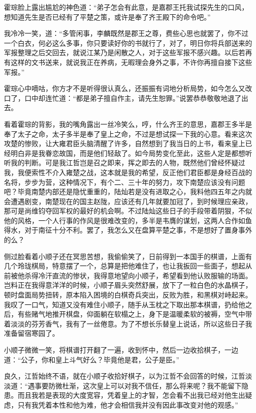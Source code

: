 霍琮脸上露出尴尬的神色道：“弟子怎会有此意，是嘉郡王托我试探先生的口风，想知道先生是否已经有了平楚之策，或许是奉了齐王殿下的命令吧。”

我冷冷一笑，道：“多管闲事，李麟既然是郡王之尊，费些心思也就罢了，你不过一个白衣，何必这么多事，你只要读好你的书就行了，对了，明日你将兵部送来的军报整理之后交回去，就说江某乃是闲散之人，对于这些军报不感兴趣。以后若再有这样的文书送来，就说我正在养病，无暇理会身外之事，不许你再擅自接下这些军报。”

霍琮心中嘀咕，你方才不是听得很认真么，还振振有词地分析局势，如今怎么又改口了，口中却连忙道：“都是弟子擅自作主，请先生恕罪。”说罢恭恭敬敬地退了出去。

看着霍琮的背影，我的嘴角露出一丝冷笑么，哼，什么齐王的意思，嘉郡王多半是奉了太子之命，太子多半是奉了皇上之命，不过是想试探一下我的心意。看来这次攻楚的惨败，让大雍君臣头脑清醒了许多，自然想到了我当日的上书，看来皇上已经明白非是我眷恋故国，而是他们轻敌了。如今局势变化至此，这些人定是都想听听我的判断。可是我江哲岂是召之即来，挥之即去的人物，既然他们曾经怀疑过我，我便索性不介入雍楚之战，这本就是我的希望，反正他们君臣都是身经百战的名将，步步为营，这种情况下，有个二、三十年的努力，攻下南楚应该没有问题吧？毕竟南楚内部还是隐忧重重的，陆灿若是没有进取之心，我料他四五年之内就会遭遇剧变，南楚现在的国主赵陇，应该还有几年就要加冠了，到时候理应亲政，那可是尚维钧夺回军权的最好的机会啊。不过陆灿这些日子的手段带着阴狠，不似他的风格，一个人行事的作风是很难改变的，多半是韦膺的谋划，这两人合作如鱼得水，对于南征十分不利。罢了，我怎么又在盘算平楚之事，不是想好了置身事外的么？

侧过脸看着小顺子还在冥思苦想，我偷偷笑了，日前得到一本国手的棋谱，上面有几个玲珑棋局，特意摆了一个，总算是把他难住了，也让我扳回一些面子，想起从前被他杀得冷汗直流的惨状，我得意地望向小顺子，希望看到他认败服输的场面。岂料正在我得意洋洋的时候，小顺子眉头突然舒展，放下了一粒白色的水晶棋子，顿时盘面局势扭转，原本陷入困境的白棋奇兵突出，反败为胜，和黑棋对峙起来。我叹了一口气，知道又没有难住小顺子，随手从玉枕之下取出那本棋谱，扔给他之后，有些赌气地推开棋盘，仰面躺在软榻之上，身下是温暖柔软的被褥，空气中带着淡淡的芬芳香气，我有了一丝倦意。为了不想长乐替皇上说话，所以这些日子我准备留宿寒园了。

小顺子微微一笑，将棋谱打开翻了一遍，收到怀中，然后一边收拾棋子，一边道：“公子，你和皇上斗气好么？毕竟他是君，公子是臣。”

良久，江哲始终不语，就在小顺子收拾好棋子，以为江哲不会回答的时候，江哲淡淡道：“遇事要防微杜渐，这次皇上可以对我不信任，那么将来呢？我不能留下隐患。而且我若是表现的大度宽容，凭着皇上的才智，怎会看不出我已经对他生出疑虑，只有我凭着本性和他为难，他才会相信我并没有因此事改变对他的观感。”

